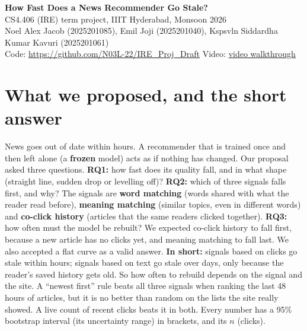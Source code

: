 \documentclass[11pt,a4paper]{article}
\newcommand{\term}[1]{\textbf{#1}}
\begin{document}
{\centering
{\Large\textbf{How Fast Does a News Recommender Go Stale?}}\\[3pt]
{\small CS4.406 (IRE) term project, IIIT Hyderabad, Monsoon 2026\\
Noel Alex Jacob (2025201085), Emil Joji (2025201040), Kspsvln Siddardha Kumar Kavuri (2025201061)\\
Code: \url{https://github.com/N03L-22/IRE_Proj_Draft} \quad
Video: \href{https://iiithydstudents-my.sharepoint.com/:f:/g/personal/kspsvlnsiddardha_k_students_iiit_ac_in/IgAkzfh2iVh8Q7G_a_I2dOG-Abb17vASNM5Lf02P7EXHisI?e=9iryaa}{video walkthrough}}\par}

\section{What we proposed, and the short answer}
News goes out of date within hours. A recommender that is trained once and then left alone (a \term{frozen} model) acts as if nothing has changed. Our proposal asked three questions. \textbf{RQ1:} how fast does its quality fall, and in what shape (straight line, sudden drop or levelling off)? \textbf{RQ2:} which of three signals falls first, and why? The signals are \term{word matching} (words shared with what the reader read before), \term{meaning matching} (similar topics, even in different words) and \term{co-click history} (articles that the same readers clicked together). \textbf{RQ3:} how often must the model be rebuilt? We expected co-click history to fall first, because a new article has no clicks yet, and meaning matching to fall last. We also accepted a flat curve as a valid answer. \textbf{In short:} signals based on clicks go stale within hours; signals based on text go stale over days, only because the reader's saved history gets old. So how often to rebuild depends on the signal and the site. A ``newest first'' rule beats all three signals when ranking the last 48 hours of articles, but it is no better than random on the lists the site really showed. A live count of recent clicks beats it in both. Every number has a 95\% bootstrap interval (its uncertainty range) in brackets, and its $n$ (clicks).
\end{document}

